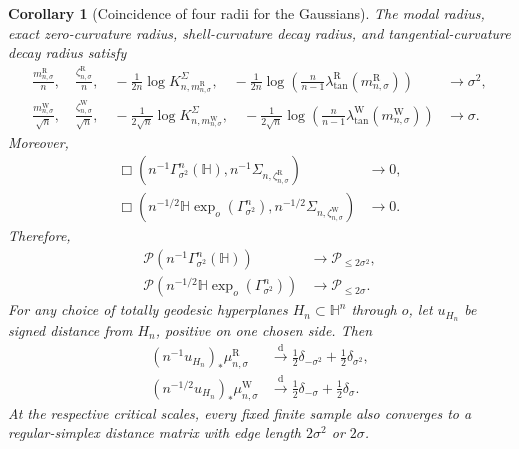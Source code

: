 \documentclass{amsart}
\numberwithin{equation}{section}
\theoremstyle{plain}
\newtheorem{cor}[thm]{Corollary}
\theoremstyle{definition}
\theoremstyle{remark}
\newcommand{\Hyp}{\mathbb{H}}
\newcommand{\Pyr}{\mathcal{P}}
\newcommand{\RGauss}[2]{\Gamma^{#1}_{#2^2}(\Hyp)}
\newcommand{\WGauss}[2]{\Hyp\exp_o(\Gamma^{#1}_{#2^2})}
\begin{document}
\begin{cor}[Coincidence of four radii for the Gaussians]
\label{cor:gaussian-coincidence}
	The modal radius, exact zero-curvature radius, shell-curvature decay
	radius, and tangential-curvature decay radius satisfy
	\begin{align}
		\frac{m^{\mathrm R}_{n,\sigma}}n,\quad
		\frac{\zeta^{\mathrm R}_{n,\sigma}}n,\quad
		-\frac1{2n}\log K_{n,m^{\mathrm R}_{n,\sigma}}^\Sigma,\quad
		-\frac1{2n}\log\left(
		\frac n{n-1}
		\lambda^{\mathrm R}_{\mathrm{tan}}
		(m^{\mathrm R}_{n,\sigma})\right)
		&\longrightarrow\sigma^2,
		\label{eq:R-radius-coincidence}\\
		\frac{m^{\mathrm W}_{n,\sigma}}{\sqrt n},\quad
		\frac{\zeta^{\mathrm W}_{n,\sigma}}{\sqrt n},\quad
		-\frac1{2\sqrt n}
		\log K_{n,m^{\mathrm W}_{n,\sigma}}^\Sigma,\quad
		-\frac1{2\sqrt n}\log\left(
		\frac n{n-1}
		\lambda^{\mathrm W}_{\mathrm{tan}}
		(m^{\mathrm W}_{n,\sigma})\right)
		&\longrightarrow\sigma.
		\label{eq:W-radius-coincidence}
	\end{align}
	Moreover,
	\begin{align}
		\Box\left(
		n^{-1}\RGauss{n}{\sigma},
		n^{-1}\Sigma_{n,\zeta^{\mathrm R}_{n,\sigma}}
		\right)&\longrightarrow0,
		\label{eq:R-zero-box}\\
		\Box\left(
		n^{-1/2}\WGauss{n}{\sigma},
		n^{-1/2}\Sigma_{n,\zeta^{\mathrm W}_{n,\sigma}}
		\right)&\longrightarrow0.
		\label{eq:W-zero-box}
	\end{align}
	Therefore,
	\begin{align}
		\Pyr(n^{-1}\RGauss{n}{\sigma})
		&\longrightarrow\mathcal P_{\le2\sigma^2},
		\label{eq:R-pyramid}\\
\Pyr(n^{-1/2}\WGauss{n}{\sigma}) &\longrightarrow\mathcal P_{\le2\sigma}. \label{eq:W-pyramid}
	\end{align}
	For any choice of totally geodesic hyperplanes
	$H_n\subset\Hyp^n$ through $o$, let $u_{H_n}$ be signed distance from
	$H_n$, positive on one chosen side.  Then
	\begin{align}
		(n^{-1}u_{H_n})_*\mu^{\mathrm R}_{n,\sigma}
		&\overset{\mathrm d}{\longrightarrow}
		\frac12\delta_{-\sigma^2}+\frac12\delta_{\sigma^2},
		\label{eq:R-witness}\\
		(n^{-1/2}u_{H_n})_*\mu^{\mathrm W}_{n,\sigma}
		&\overset{\mathrm d}{\longrightarrow}
		\frac12\delta_{-\sigma}+\frac12\delta_{\sigma}.
		\label{eq:W-witness}
	\end{align}
	At the respective critical scales, every fixed finite sample also
	converges to a regular-simplex distance matrix with edge length
	$2\sigma^2$ or $2\sigma$.
\end{cor}
\end{document}
